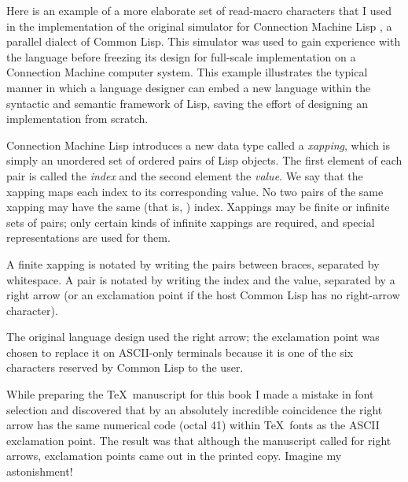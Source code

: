 \begin{defun}[Function]
\begin{new}
Here is an example of a more elaborate set of read-macro characters
that I used in the implementation of the original
simulator for Connection Machine Lisp
\cite{CONNECTION-MACHINE-LISP,CMLISP-IMPLEMENTATION},
a parallel dialect of Common Lisp.  This simulator was used to gain experience with
the language before freezing its design for full-scale implementation on a
Connection Machine computer system.  This example illustrates the typical manner
in which a language designer can embed a new language within the syntactic and
semantic framework of Lisp, saving the effort of designing an implementation
from scratch.

Connection Machine Lisp introduces a new data type called a {\it xapping},
which is simply an unordered set of ordered pairs of Lisp objects.
The first element of each pair is called the {\it index} and the second element
the {\it value}.  We say that the xapping maps each index to its corresponding value.
No two pairs of the same xapping may have the same (that is, ) index.
Xappings may be finite or infinite sets of pairs; only certain kinds
of infinite xappings are required, and special representations are used for them.

A finite xapping is notated by writing the pairs between braces, separated by whitespace.
A pair is notated by writing the index and the value, separated by a right arrow
(or an exclamation point if the host Common Lisp has no right-arrow character).

\beforenoterule
\begin{sideremark}
The original language design used the right arrow; the exclamation point was
chosen to replace it on {ASCII}-only terminals because it is one of
the six characters  reserved by Common Lisp to the user.

While preparing the \TeX\ manuscript for this book I made a mistake
in font selection and discovered that by an absolutely incredible coincidence
the right arrow has the same numerical code (octal 41) within \TeX\ fonts
as the {ASCII} exclamation point.
The result was that although the manuscript called for right arrows,
exclamation points came out in the printed copy.  Imagine my astonishment!
\end{sideremark}
\afternoterule


\end{new}
\end{defun}
